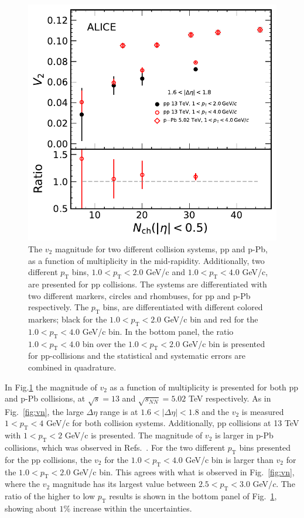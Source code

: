 \begin{figure}[h!]
	\centering
	\includegraphics[width=0.6 \textwidth]{figures/Fig6_v2Mult_allSystemsComp2.pdf} 
	\caption{The $v_2$ magnitude for two different collision systems, pp and p-Pb, as a function of multiplicity in the mid-rapidity. Additionally, two different $p_\mathrm{T}$ bins, $1.0<p_\mathrm{T}<2.0$ GeV/c and $1.0<p_\mathrm{T}<4.0$ GeV/c, are presented for pp collisions. The systems are differentiated with two different markers, circles and rhombuses, for pp and p-Pb respectively. The $p_\mathrm{T}$ bins, are differentiated with different colored markers; black for the $1.0<p_\mathrm{T}<2.0$ GeV/c bin and red for the $1.0<p_\mathrm{T}<4.0$ GeV/c bin. In the bottom panel, the ratio $1.0<p_\mathrm{T}<4.0$ bin over the $1.0<p_\mathrm{T}<2.0$ GeV/c bin is presented for pp-collisions and the statistical and systematic errors are combined in quadrature.} 
	\label{fig:v2mult}
\end{figure}

In Fig.\ref{fig:v2mult} the magnitude of $v_2$ as a function of multiplicity is presented for both pp and p-Pb collisions, at $\sqrt{s}=13$ and $\sqrt{s_{NN}}=5.02$ TeV respectively. As in Fig.~\ref{fig:vn}, the large $\Delta\eta$ range is at $1.6<|\Delta\eta|<1.8$ and the $v_2$ is measured $1<p_{\mathrm{T}}<4$ GeV/c for both collision systems. Additionally, pp collisions at 13 TeV with $1<p_{\mathrm{T}}<2$ GeV/c is presented. The magnitude of $v_2$ is larger in p-Pb collisions, which was observed in Refs.~\cite{ATLAS:2015hzw,ATLAS:2016yzd, Khachatryan:2015lva}. For the two different $p_\mathrm{T}$ bins presented for the pp collisions, the $v_2$ for the $1.0<p_\mathrm{T}<4.0$ GeV/c bin is larger than $v_2$ for the $1.0<p_\mathrm{T}<2.0$ GeV/c bin. This agrees with what is observed in Fig.~\ref{fig:vn}, where the $v_2$ magnitude has its largest value between $2.5<p_\mathrm{T}<3.0$ GeV/$c$. The ratio of the higher to low $p_\mathrm{T}$ results is shown in the bottom panel of Fig.~\ref{fig:v2mult}, showing about $1\%$ increase within the uncertainties.
%

